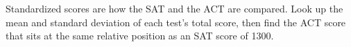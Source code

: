 \vspace{0.12in}

\boxguard[12]
\begin{extensionbox}
\small
Standardized scores are how the SAT and the ACT are compared. Look up the mean and standard
deviation of each test's total score, then find the ACT score that sits at the same relative
position as an SAT score of 1300.\\[4pt]
\end{extensionbox}

\vspace{0.12in}



